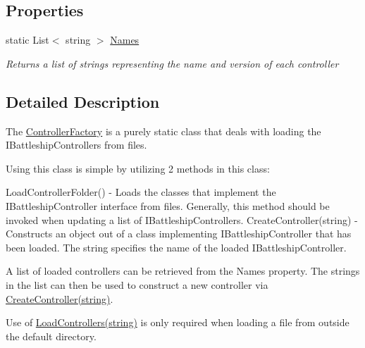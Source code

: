\subsection*{Properties}
\begin{DoxyCompactItemize}
\item 
\hypertarget{class_m_b_c_1_1_core_1_1util_1_1_controller_factory_a7120a568455917999b3f7428161a491e}{static List$<$ string $>$ \hyperlink{class_m_b_c_1_1_core_1_1util_1_1_controller_factory_a7120a568455917999b3f7428161a491e}{Names}}\label{class_m_b_c_1_1_core_1_1util_1_1_controller_factory_a7120a568455917999b3f7428161a491e}

\begin{DoxyCompactList}\small\item\em Returns a list of strings representing the name and version of each controller\end{DoxyCompactList}\end{DoxyCompactItemize}


\subsection{Detailed Description}
The \hyperlink{class_m_b_c_1_1_core_1_1util_1_1_controller_factory}{Controller\-Factory} is a purely static class that deals with loading the I\-Battleship\-Controllers from files. 

Using this class is simple by utilizing 2 methods in this class\-: \begin{DoxyVerb} LoadControllerFolder() - Loads the classes that implement the IBattleshipController interface from files.
                          Generally, this method should be invoked when updating a list of IBattleshipControllers.
 CreateController(string) - Constructs an object out of a class implementing IBattleshipController that has been loaded.
                            The string specifies the name of the loaded IBattleshipController.
\end{DoxyVerb}


A list of loaded controllers can be retrieved from the Names property. The strings in the list can then be used to construct a new controller via \hyperlink{class_m_b_c_1_1_core_1_1util_1_1_controller_factory_ac10a922348ccb9df851b084948943f3d}{Create\-Controller(string)}.

Use of \hyperlink{class_m_b_c_1_1_core_1_1util_1_1_controller_factory_a8550517417616d362cbd96d7cf72f960}{Load\-Controllers(string)} is only required when loading a file from outside the default directory. 


